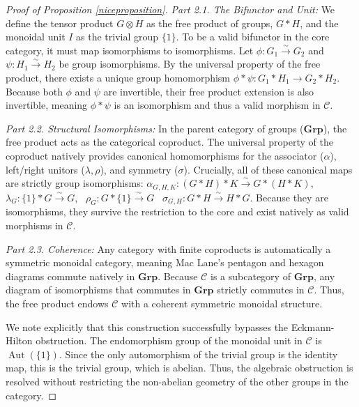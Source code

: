 \documentclass{amsart}
\begin{document}
\begin{proof}[Proof of Proposition \ref{niceproposition}]
\textit{Part 2.1. The Bifunctor and Unit:} We define the tensor product $G \otimes H$ as the free product of groups, $G \ast H$, and the monoidal unit $I$ as the trivial group $\{1\}$. To be a valid bifunctor in the core category, it must map isomorphisms to isomorphisms. Let $\phi: G_1 \xrightarrow{\sim} G_2$ and $\psi: H_1 \xrightarrow{\sim} H_2$ be group isomorphisms. By the universal property of the free product, there exists a unique group homomorphism $\phi \ast \psi: G_1 \ast H_1 \to G_2 \ast H_2$. Because both $\phi$ and $\psi$ are invertible, their free product extension is also invertible, meaning $\phi \ast \psi$ is an isomorphism and thus a valid morphism in $\mathcal{C}$.

\medskip

\textit{Part 2.2. Structural Isomorphisms:} In the parent category of groups ($\mathbf{Grp}$), the free product acts as the categorical coproduct. The universal property of the coproduct natively provides canonical homomorphisms for the associator ($\alpha$), left/right unitors ($\lambda, \rho$), and symmetry ($\sigma$). Crucially, all of these canonical maps are strictly group isomorphisms:   $ \alpha_{G,H,K}: (G \ast H) \ast K \xrightarrow{\sim} G \ast (H \ast K)$, \,
   $\lambda_G: \{1\} \ast G \xrightarrow{\sim} G$, \,
    $\rho_G: G \ast \{1\} \xrightarrow{\sim} G$ \,
    $\sigma_{G,H}: G \ast H \xrightarrow{\sim} H \ast G$. Because they are isomorphisms, they survive the restriction to the core and exist natively as valid morphisms in $\mathcal{C}$.

\medskip

\textit{Part 2.3. Coherence:} Any category with finite coproducts is automatically a symmetric monoidal category, meaning Mac Lane's pentagon and hexagon diagrams commute natively in $\mathbf{Grp}$. Because $\mathcal{C}$ is a subcategory of $\mathbf{Grp}$, any diagram of isomorphisms that commutes in $\mathbf{Grp}$ strictly commutes in $\mathcal{C}$. Thus, the free product endows $\mathcal{C}$ with a coherent symmetric monoidal structure.

We note explicitly that this construction successfully bypasses the Eckmann-Hilton obstruction. The endomorphism group of the monoidal unit in $\mathcal{C}$ is $\operatorname{Aut}(\{1\})$. Since the only automorphism of the trivial group is the identity map, this is the trivial group, which is abelian. Thus, the algebraic obstruction is resolved without restricting the non-abelian geometry of the other groups in the category.

\medskip


\end{proof}
\end{document}
